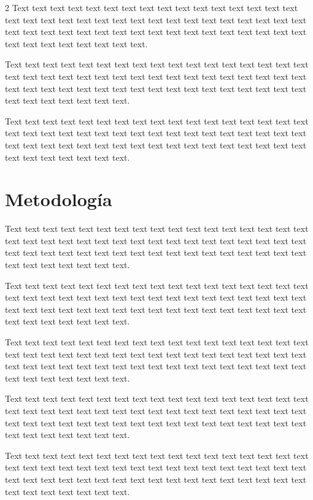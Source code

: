 \documentclass[12pt,twoside]{apa7}
\begin{document}
\begin{multicols}{2}
Text text text text text text text text text text text text text text text text text text text text text text text text text text text text text text text text text text text text text text text text text text text text text text text text text text text text text text text text text text.

Text text text text text text text text text text text text text text text text text text text text text text text text text text text text text text text text text text text text text text text text text text text text text text text text text text text text text text text text text text.

Text text text text text text text text text text text text text text text text text text text text text text text text text text text text text text text text text text text text text text text text text text text text text text text text text text text text text text text text text text.
\section{Metodología}
Text text text text text text text text text text text text text text text text text text text text text text text text text text text text text text text text text text text text text text text text text text text text text text text text text text text text text text text text text text.

Text text text text text text text text text text text text text text text text text text text text text text text text text text text text text text text text text text text text text text text text text text text text text text text text text text text text text text text text text text.

Text text text text text text text text text text text text text text text text text text text text text text text text text text text text text text text text text text text text text text text text text text text text text text text text text text text text text text text text text text.

Text text text text text text text text text text text text text text text text text text text text text text text text text text text text text text text text text text text text text text text text text text text text text text text text text text text text text text text text text text.

Text text text text text text text text text text text text text text text text text text text text text text text text text text text text text text text text text text text text text text text text text text text text text text text text text text text text text text text text text text.


\end{multicols}
\end{document}
